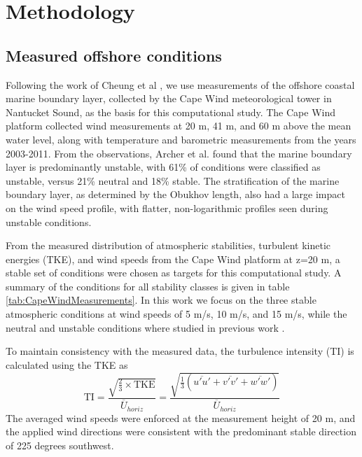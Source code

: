 \section{Methodology}

\subsection{Measured offshore conditions}

Following the work of Cheung et al \cite{cheung2020large}, we use
measurements of the offshore coastal marine boundary layer, collected
by the Cape Wind meteorological tower in Nantucket Sound, as the basis
for this computational study.  The Cape Wind platform collected wind
measurements at 20 m, 41 m, and 60 m above the mean water level, along
with temperature and barometric measurements from the years 2003-2011.
From the observations, Archer et al.\cite{archer2016predominance}
found that the marine boundary layer is predominantly unstable, with
61\% of conditions were classified as unstable, versus 21\% neutral and
18\% stable.  The stratification of the marine boundary layer, as
determined by the Obukhov length, also had a large impact on the wind
speed profile, with flatter, non-logarithmic profiles seen during
unstable conditions.

From the measured distribution of atmospheric stabilities, turbulent
kinetic energies (TKE), and wind speeds from the Cape Wind platform at
z=20 m, a stable set of conditions were chosen as targets for this
computational study.  A summary of the conditions for all stability
classes is given in table \ref{tab:CapeWindMeasurements}. In this work we
focus on the three stable atmospheric conditions at wind speeds of
5 m/s, 10 m/s, and 15 m/s, while the neutral and unstable conditions
where studied in previous work \cite{cheung2020large}.

To maintain consistency with the measured data, the turbulence
intensity (TI) is calculated using the TKE as
\begin{equation}
  \textrm{TI} =
  \frac{\sqrt{\frac{2}{3}\times\textrm{TKE}}}{\overline{U}_{horiz}} =
  \frac{\sqrt{\frac{1}{3}\left( \overline{u'u'} + \overline{v'v'} + \overline{w'w'}
      \right)}}{\overline{U}_{horiz}}
\end{equation}
The averaged wind speeds were enforced at the measurement height of
20 m, and the applied wind directions were consistent with the
predominant stable direction of 225 degrees southwest.

